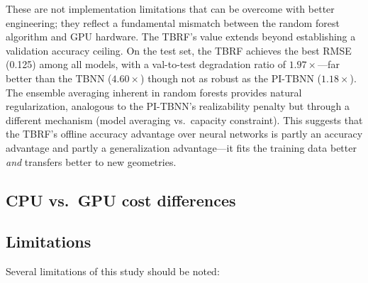 These are not implementation limitations that can be overcome with better engineering; they reflect a fundamental mismatch between the random forest algorithm and GPU hardware.
The TBRF's value extends beyond establishing a validation accuracy ceiling.
On the test set, the TBRF achieves the best RMSE (0.125) among all models, with a val-to-test degradation ratio of $1.97\times$---far better than the TBNN ($4.60\times$) though not as robust as the PI-TBNN ($1.18\times$).
The ensemble averaging inherent in random forests provides natural regularization, analogous to the PI-TBNN's realizability penalty but through a different mechanism (model averaging vs.\ capacity constraint).
This suggests that the TBRF's offline accuracy advantage over neural networks is partly an accuracy advantage and partly a generalization advantage---it fits the training data better \emph{and} transfers better to new geometries.

\subsection{CPU vs.\ GPU cost differences}


\subsection{Limitations}

Several limitations of this study should be noted:

